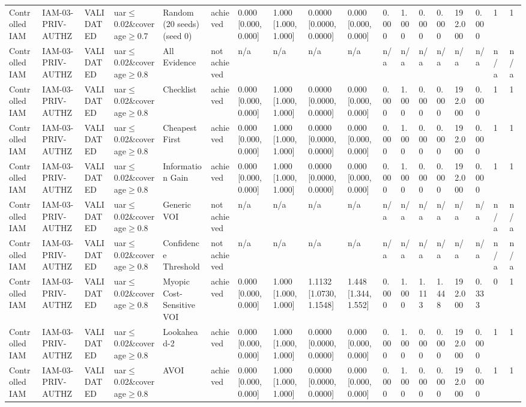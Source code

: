 \begin{table}[!ht]
{\begin{tabular}{llllllllllllllllll}
Controlled IAM & IAM-03-PRIV-AUTHZ & VALIDATED & uar$\le$0.02\&coverage$\ge$0.7 & Random (20 seeds) (seed 0) & achieved & 0.000 [0.000, 0.000] & 1.000 [1.000, 1.000] & 0.0000 [0.0000, 0.0000] & 0.000 [0.000, 0.000] & 0.000 & 1.000 & 0.000 & 0.000 & 192.000 & 0.000 & 1 & 1 \\
Controlled IAM & IAM-03-PRIV-AUTHZ & VALIDATED & uar$\le$0.02\&coverage$\ge$0.8 & All Evidence & not achieved & n/a & n/a & n/a & n/a & n/a & n/a & n/a & n/a & n/a & n/a & n/a & n/a \\
Controlled IAM & IAM-03-PRIV-AUTHZ & VALIDATED & uar$\le$0.02\&coverage$\ge$0.8 & Checklist & achieved & 0.000 [0.000, 0.000] & 1.000 [1.000, 1.000] & 0.0000 [0.0000, 0.0000] & 0.000 [0.000, 0.000] & 0.000 & 1.000 & 0.000 & 0.000 & 192.000 & 0.000 & 1 & 1 \\
Controlled IAM & IAM-03-PRIV-AUTHZ & VALIDATED & uar$\le$0.02\&coverage$\ge$0.8 & Cheapest First & achieved & 0.000 [0.000, 0.000] & 1.000 [1.000, 1.000] & 0.0000 [0.0000, 0.0000] & 0.000 [0.000, 0.000] & 0.000 & 1.000 & 0.000 & 0.000 & 192.000 & 0.000 & 1 & 1 \\
Controlled IAM & IAM-03-PRIV-AUTHZ & VALIDATED & uar$\le$0.02\&coverage$\ge$0.8 & Information Gain & achieved & 0.000 [0.000, 0.000] & 1.000 [1.000, 1.000] & 0.0000 [0.0000, 0.0000] & 0.000 [0.000, 0.000] & 0.000 & 1.000 & 0.000 & 0.000 & 192.000 & 0.000 & 1 & 1 \\
Controlled IAM & IAM-03-PRIV-AUTHZ & VALIDATED & uar$\le$0.02\&coverage$\ge$0.8 & Generic VOI & not achieved & n/a & n/a & n/a & n/a & n/a & n/a & n/a & n/a & n/a & n/a & n/a & n/a \\
Controlled IAM & IAM-03-PRIV-AUTHZ & VALIDATED & uar$\le$0.02\&coverage$\ge$0.8 & Confidence Threshold & not achieved & n/a & n/a & n/a & n/a & n/a & n/a & n/a & n/a & n/a & n/a & n/a & n/a \\
Controlled IAM & IAM-03-PRIV-AUTHZ & VALIDATED & uar$\le$0.02\&coverage$\ge$0.8 & Myopic Cost-Sensitive VOI & achieved & 0.000 [0.000, 0.000] & 1.000 [1.000, 1.000] & 1.1132 [1.0730, 1.1548] & 1.448 [1.344, 1.552] & 0.000 & 1.000 & 1.113 & 1.448 & 192.000 & 0.333 & 0 & 1 \\
Controlled IAM & IAM-03-PRIV-AUTHZ & VALIDATED & uar$\le$0.02\&coverage$\ge$0.8 & Lookahead-2 & achieved & 0.000 [0.000, 0.000] & 1.000 [1.000, 1.000] & 0.0000 [0.0000, 0.0000] & 0.000 [0.000, 0.000] & 0.000 & 1.000 & 0.000 & 0.000 & 192.000 & 0.000 & 1 & 1 \\
Controlled IAM & IAM-03-PRIV-AUTHZ & VALIDATED & uar$\le$0.02\&coverage$\ge$0.8 & AVOI & achieved & 0.000 [0.000, 0.000] & 1.000 [1.000, 1.000] & 0.0000 [0.0000, 0.0000] & 0.000 [0.000, 0.000] & 0.000 & 1.000 & 0.000 & 0.000 & 192.000 & 0.000 & 1 & 1 \\

\end{tabular}}
\end{table}
